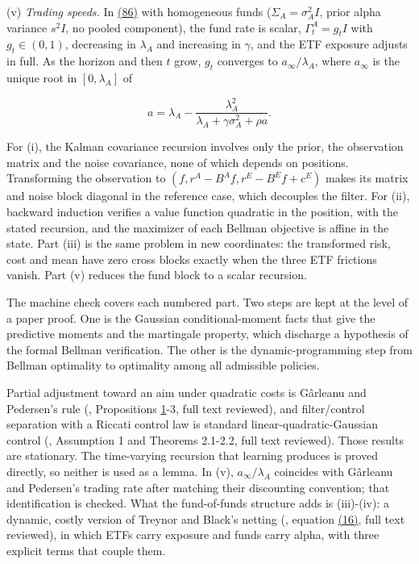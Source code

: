 \documentclass[11pt]{article}
\begin{document}
(v) \emph{Trading speeds.} In \hyperref[eq:86]{(86)} with homogeneous funds
(\(\Sigma_A=\sigma_A^2I\), prior alpha variance \(s^2I\), no pooled
component), the fund rate is scalar, \(\Gamma^A_t=g_tI\) with \(g_t\in(0,1)\),
decreasing in \(\lambda_A\) and increasing in \(\gamma\), and the ETF
exposure adjusts in full. As the horizon and then \(t\) grow, \(g_t\)
converges to \(a_\infty/\lambda_A\), where \(a_\infty\) is the unique root in
\([0,\lambda_A]\) of

\begin{equation*}
a=\lambda_A-\frac{\lambda_A^2}{\lambda_A+\gamma\sigma_A^2+\rho a}.\tag{87}\label{eq:87}
\end{equation*}

For (i), the Kalman covariance recursion involves only the prior, the
observation matrix and the noise covariance, none of which depends
on positions. Transforming the observation to
\((f,r^A-B^Af,r^E-B^Ef+c^E)\) makes its matrix and noise block diagonal
in the reference case, which decouples the filter. For (ii), backward
induction verifies a value function quadratic in the position, with
the stated recursion, and the maximizer of each Bellman objective is
affine in the state. Part (iii) is the same problem in new
coordinates: the transformed risk, cost and mean have zero cross
blocks exactly when the three ETF frictions vanish. Part (v) reduces
the fund block to a scalar recursion.

The machine check covers each numbered part. Two steps are kept at the
level of a paper proof. One is the Gaussian conditional-moment facts
that give the predictive moments and the martingale property, which
discharge a hypothesis of the formal Bellman verification. The other
is the dynamic-programming step from Bellman optimality to optimality
among all admissible policies.

Partial adjustment toward an aim under quadratic costs is Gârleanu
and Pedersen's rule (\cite{garleanu2009dynamic}, Propositions \hyperref[res:Proposition-1]{1}-3, full
text reviewed), and filter/control separation with a Riccati control
law is standard linear-quadratic-Gaussian control (\cite{abeille2016lqg},
Assumption 1 and Theorems 2.1-2.2, full text reviewed). Those results
are stationary. The time-varying recursion that learning produces is
proved directly, so neither is used as a lemma. In (v), \(a_\infty/\lambda_A\)
coincides with Gârleanu and Pedersen's trading rate after matching
their discounting convention; that identification is checked. What
the fund-of-funds structure adds is (iii)-(iv): a dynamic, costly
version of Treynor and Black's netting (\cite{treynor1973security},
equation \hyperref[eq:16]{(16)}, full text reviewed), in which ETFs carry exposure
and funds carry alpha, with three explicit terms that couple them.
\end{document}
